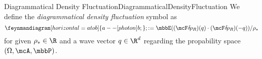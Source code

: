 \begin{mdef}{Diagrammatical Density Fluctuation}{DiagrammaticalDensityFluctuation}
    We define the \emph{diagrammatical density fluctuation} symbol as 
    \[
        \feynmandiagram[horizontal=a to b]{a -- [photon] b;}; := \mbbE((\mcF\drho_{R})(q)\cdot(\mcF\drho_{R})(-q))/\rho_*
    \]
    for given $\rho_*\in\R$ and a wave vector $q\in\R^d$ regarding the propability space $(\Omega,\mcA,\mbbP)$.
\end{mdef}